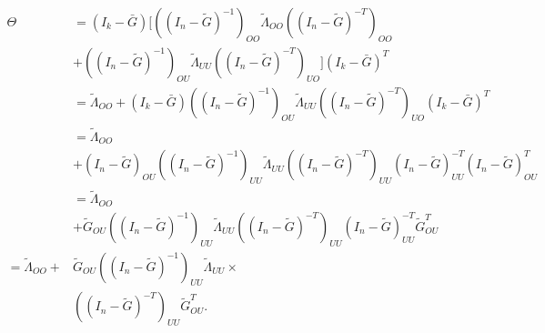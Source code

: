 \documentclass[accepted]{uai2021} %
\begin{document}
\begin{align*}
\Theta & = (I_k - \bar{G})[((I_n - 
\tilde{G})^{-1})_{OO}\tilde{\Lambda}_{OO}((I_n - \tilde{G})^{-T})_{OO} \\ & + 
((I_n 
- 
\tilde{G})^{-1})_{OU}\tilde{\Lambda}_{UU}((I_n - \tilde{G})^{-T})_{UO}](I_k - 
\bar{G})^T \\
& = \tilde{\Lambda}_{OO} + (I_k - \bar{G})((I_n 
- 
\tilde{G})^{-1})_{OU}\tilde{\Lambda}_{UU}((I_n - \tilde{G})^{-T})_{UO}(I_k - 
\bar{G})^T \\
& = \tilde{\Lambda}_{OO} \\ & + (I_n - \tilde{G})_{OU}((I_n - 
\tilde{G})^{-1})_{UU}\tilde{\Lambda}_{UU}((I_n - \tilde{G})^{-T})_{UU}(I_n - 
\tilde{G})_{UU}^{-T}(I_n - 
\tilde{G})_{OU}^T \\
& = \tilde{\Lambda}_{OO} \\ & + \tilde{G}_{OU}((I_n - 
\tilde{G})^{-1})_{UU}\tilde{\Lambda}_{UU}((I_n - \tilde{G})^{-T})_{UU}(I_n - 
\tilde{G})_{UU}^{-T} 
\tilde{G}_{OU}^T \\
= \tilde{\Lambda}_{OO} + & \tilde{G}_{OU}((I_n - 
\tilde{G})^{-1})_{UU}\tilde{\Lambda}_{UU} \times  \\ & ((I_n - 
\tilde{G})^{-T})_{UU}
\tilde{G}_{OU}^T.
\end{align*}



\end{document}
